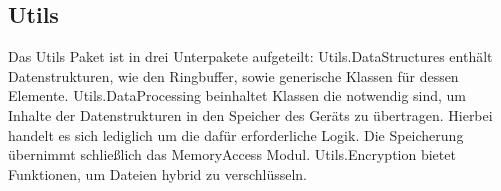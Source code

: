 \label{app:module:utils}\subsection{Utils}
Das Utils Paket ist in drei Unterpakete aufgeteilt: Utils.DataStructures enthält Datenstrukturen, wie den Ringbuffer, sowie generische Klassen für dessen  Elemente. Utils.DataProcessing beinhaltet Klassen die notwendig sind, um Inhalte der Datenstrukturen in den Speicher des Geräts zu übertragen. Hierbei handelt es sich lediglich um die dafür erforderliche Logik. Die Speicherung übernimmt schließlich das MemoryAccess Modul. Utils.Encryption bietet Funktionen, um Dateien hybrid zu verschlüsseln.